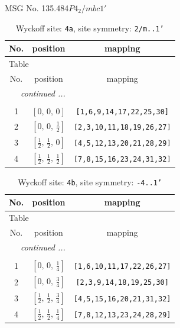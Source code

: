 \documentclass[fleqn,8pt]{jsarticle}
\begin{document}
\setcounter{MaxMatrixCols}{32}

\renewcommand{\tablename}{Table~}
\renewcommand{\figurename}{Figure~}
\begin{center}
\LARGE
MSG No. 135.484\quad$P4_{2}/mbc1'$
\end{center}
\renewcommand{\arraystretch}{1.2}
\begin{longtable}{ccc}
\caption{Wyckoff site: {\tt 4a}, site symmetry: {\tt 2/m..1'}}
 \\
 \hline \hline
No. & position & mapping \\ \hline \endfirsthead

\multicolumn{2}{l}{\tablename\ \thetable{}} \\
 \hline \hline
No. & position & mapping \\ \hline \endhead

 \hline \hline
\multicolumn{2}{r}{\footnotesize\it continued ...} \\ \endfoot

 \hline \hline
\multicolumn{2}{r}{} \\ \endlastfoot

1 & $\left[ 0,\, 0,\, 0 \right]$ & {\tt [1,6,9,14,17,22,25,30]} \\ \hline
2 & $\left[ 0,\, 0,\, \frac{1}{2} \right]$ & {\tt [2,3,10,11,18,19,26,27]} \\ \hline
3 & $\left[ \frac{1}{2},\, \frac{1}{2},\, 0 \right]$ & {\tt [4,5,12,13,20,21,28,29]} \\ \hline
4 & $\left[ \frac{1}{2},\, \frac{1}{2},\, \frac{1}{2} \right]$ & {\tt [7,8,15,16,23,24,31,32]} \\
\end{longtable}
\renewcommand{\arraystretch}{1.2}
\begin{longtable}{ccc}
\caption{Wyckoff site: {\tt 4b}, site symmetry: {\tt -4..1'}}
 \\
 \hline \hline
No. & position & mapping \\ \hline \endfirsthead

\multicolumn{2}{l}{\tablename\ \thetable{}} \\
 \hline \hline
No. & position & mapping \\ \hline \endhead

 \hline \hline
\multicolumn{2}{r}{\footnotesize\it continued ...} \\ \endfoot

 \hline \hline
\multicolumn{2}{r}{} \\ \endlastfoot

1 & $\left[ 0,\, 0,\, \frac{1}{4} \right]$ & {\tt [1,6,10,11,17,22,26,27]} \\ \hline
2 & $\left[ 0,\, 0,\, \frac{3}{4} \right]$ & {\tt [2,3,9,14,18,19,25,30]} \\ \hline
3 & $\left[ \frac{1}{2},\, \frac{1}{2},\, \frac{3}{4} \right]$ & {\tt [4,5,15,16,20,21,31,32]} \\ \hline
4 & $\left[ \frac{1}{2},\, \frac{1}{2},\, \frac{1}{4} \right]$ & {\tt [7,8,12,13,23,24,28,29]} \\
\end{longtable}
\end{document}
